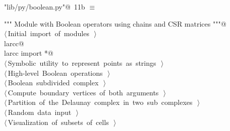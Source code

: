 \documentclass[11pt,oneside]{article}	%
\begin{document}
\begin{flushleft} \small
\begin{minipage}{\linewidth} \label{scrap16}
\protect{}\verb@"lib/py/boolean.py"@\nobreak\ {\footnotesize 11b }$\equiv$
\vspace{-1ex}
\begin{list}{}{} \item
\mbox{}\verb@""" Module with Boolean operators using chains and CSR matrices """@\\
\mbox{}\verb@@\hbox{$\langle\,$Initial import of modules\nobreak\ {\footnotesize {}}$\,\rangle$}\verb@@\\
\mbox{}\verb@import larcc@\\
\mbox{}\verb@from larcc import *@\\
\mbox{}\verb@@\hbox{$\langle\,$Symbolic utility to represent points as strings\nobreak\ {\footnotesize {}}$\,\rangle$}\verb@@\\
\mbox{}\verb@@\hbox{$\langle\,$High-level Boolean operations\nobreak\ {\footnotesize {}}$\,\rangle$}\verb@@\\
\mbox{}\verb@@\hbox{$\langle\,$Boolean subdivided complex\nobreak\ {\footnotesize {}}$\,\rangle$}\verb@@\\
\mbox{}\verb@@\hbox{$\langle\,$Compute boundary vertices of both arguments\nobreak\ {\footnotesize {}}$\,\rangle$}\verb@@\\
\mbox{}\verb@@\hbox{$\langle\,$Partition of the Delaunay complex in two sub complexes\nobreak\ {\footnotesize {}}$\,\rangle$}\verb@@\\
\mbox{}\verb@@\hbox{$\langle\,$Random data input\nobreak\ {\footnotesize {}}$\,\rangle$}\verb@@\\
\mbox{}\verb@@\hbox{$\langle\,$Visualization of subsets of cells\nobreak\ {\footnotesize {}}$\,\rangle$}\verb@@\\
\mbox{}\verb@@{\NWsep}
\end{list}
\vspace{-2ex}
\end{minipage}\\[4ex]
\end{flushleft}
\end{document}

